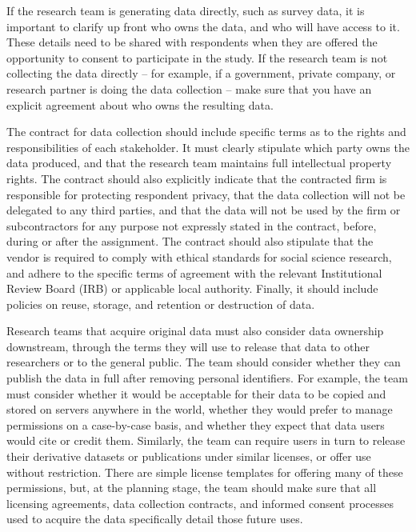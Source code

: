 If the research team is generating data directly, such as survey data,
it is important to clarify up front who owns the data,
and who will have access to it.
These details need to be shared with respondents when they are offered the opportunity
to consent to participate in the study.
If the research team is not collecting the data directly --
for example, if a government, private company, or research partner is doing the data collection --
make sure that you have an explicit agreement
about who owns the resulting data.

The contract for data collection should include specific terms
as to the rights and responsibilities of each stakeholder.
It must clearly stipulate which party owns the data produced,
and that the research team maintains full intellectual property rights.
The contract should also explicitly indicate that the contracted firm
is responsible for protecting respondent privacy,
that the data collection will not be delegated to any third parties,
and that the data will not be used by the firm or subcontractors for any purpose not expressly stated in the contract,
before, during or after the assignment.
The contract should also stipulate that the vendor is required to comply with
ethical standards for social science research,
and adhere to the specific terms of agreement with the relevant
Institutional Review Board (IRB)
or applicable local authority.
Finally, it should include policies on reuse, storage, and retention or destruction of data.

Research teams that acquire original data must also consider data ownership downstream,
through the terms they will use to release that data to other researchers or to the general public.
The team should consider whether they can publish the data in full after removing personal identifiers.
For example, the team must consider whether it would be acceptable for
their data to be copied and stored on servers anywhere in the world,
whether they would prefer to manage permissions on a case-by-case basis,
and whether they expect that data users would cite or credit them.
Similarly, the team can require users in turn to release
their derivative datasets or publications under similar licenses,
or offer use without restriction.
There are simple license templates for offering many of these permissions,
but, at the planning stage, the team should make sure
that all licensing agreements, data collection contracts,
and informed consent processes
used to acquire the data specifically detail those future uses.


